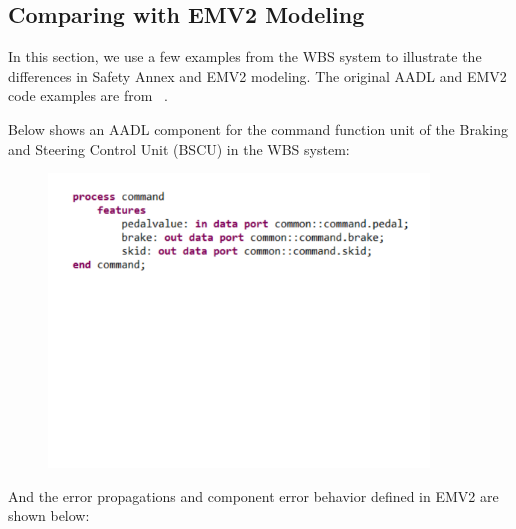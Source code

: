 \subsection{Comparing with EMV2 Modeling}
\label{subsec:comparison_with_EMV2}
In this section, we use a few examples from the WBS system to illustrate the differences in Safety Annex and EMV2 modeling. The original AADL and EMV2 code examples are from ~\cite{WBS_EMV2_Example}.

Below shows an AADL component for the command function unit of the Braking and Steering Control Unit (BSCU) in the WBS system:

\begin{figure}[h!]
	\hspace*{-4cm}
\vspace{-0.5in} 
\begin{center}
	\includegraphics[clip,width=0.9\textwidth]{images/bscu_cmd_comp.pdf}
	\end{center}
\vspace{-2.5in}
\end{figure}

And the error propagations and component error behavior defined in EMV2 are shown below:

